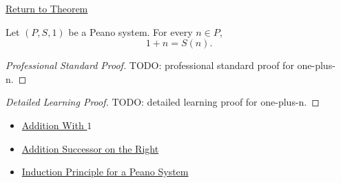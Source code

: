 \newpage
{}
\label{prf:one-plus-n}

\begin{remark*}[Return]
\hyperref[thm:one-plus-n]{Return to Theorem}
\end{remark*}

\begin{theorem*}
Let $(P,S,1)$ be a Peano system. For every $n \in P$,
\[
1+n=S(n).
\]
\end{theorem*}

\begin{proof}[Professional Standard Proof]
\LRAProofBodyStart
TODO: professional standard proof for one-plus-n.
\end{proof}

\begin{proof}[Detailed Learning Proof]
\LRAProofBodyStart
TODO: detailed learning proof for one-plus-n.
\end{proof}

\begin{remark*}
\end{remark*}

\begin{dependencies}
\begin{itemize}
  \item \hyperref[thm:addition-with-one]{Addition With $1$}
  \item \hyperref[thm:addition-successor-on-right]{Addition Successor on the Right}
  \item \hyperref[thm:induction-principle-for-peano-system]{Induction Principle for a Peano System}
\end{itemize}
\end{dependencies}

\clearpage
